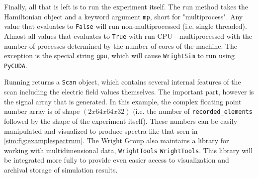 \begin{Shaded}
\begin{Highlighting}[]
\OperatorTok{=}\OperatorTok{=}\NormalTok{)}

\OperatorTok{=}\NormalTok{ [}\NormalTok{, }\NormalTok{, }\NormalTok{]}
\OperatorTok{=}\NormalTok{ [}\NormalTok{,}\NormalTok{]}
\end{Highlighting}
\end{Shaded}

Finally, all that is left is to run the experiment itself. The run
method takes the Hamiltonian object and a keyword argument \texttt{mp},
short for "multiprocess". Any value that evaluates to \texttt{False}
will run non-multiprocessed (i.e. single threaded). Almost all values
that evaluates to \texttt{True} with run CPU - multiprocessed with the
number of processes determined by the number of cores of the machine.
The exception is the special string
\texttt{\textquotesingle{}gpu\textquotesingle{}}, which will cause
\texttt{WrightSim} to run using \texttt{PyCUDA}.

\begin{Shaded}
\begin{Highlighting}[]
\OperatorTok{=}\OperatorTok{=}\NormalTok{)}

\OperatorTok{=}
\end{Highlighting}
\end{Shaded}

Running returns a \texttt{Scan} object, which contains several internal
features of the scan including the electric field values themselves. The
important part, however is the signal array that is generated. In this
example, the complex floating point number array is of shape
\((2x64x64x32)\) (i.e. the number of \texttt{recorded\_elements}
followed by the shape of the experiment itself). These numbers can be
easily manipulated and visualized to produce spectra like that seen in
\ref{sim:fig:examplespectrum}. The Wright Group also maintains a library
for working with multidimensional data, \texttt{WrightTools}
\texttt{WrightTools}. This library will be integrated more fully to
provide even easier access to visualization and archival storage of
simulation results.

